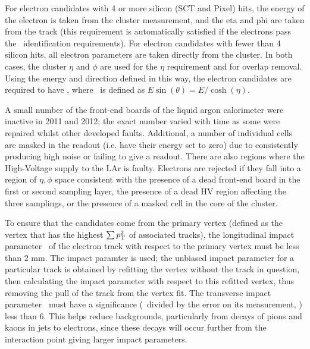 For electron candidates with 4 or more silicon (SCT and Pixel) hits, the energy
of the electron is taken from the cluster measurement, and the eta and phi are
taken from the track (this requirement is automatically satisfied if the
electrons pass the \loosePP\ identification requirements). For electron
candidates with fewer than 4 silicon hits, all electron parameters are taken
directly from the cluster. In both cases, the cluster $\eta$ and $\phi$ are used for
the $\eta$ requirement and for overlap removal. Using the energy and direction
defined in this way, the electron candidates are required to have ,
where \et\ is defined as $E\sin(\theta)=E/\cosh(\eta)$. 

A small number of the front-end boards of the liquid argon calorimeter were
inactive in 2011 and 2012; the exact number varied with time as some were
repaired whilst other developed faults. Additional, a number of individual cells
are masked in the readout (i.e. have their energy set to zero) due to
consistently producing high noise or failing to give a readout. There are also
regions where the High-Voltage supply to the LAr is faulty. Electrons are
rejected if they fall into a region of
$\eta, \phi$ space consistent with the presence of a dead front-end board in
the first or second sampling layer, the presence of a dead HV region affecting the
three samplings, or the presence of a masked cell in the core of the cluster.

To ensure that the candidates come from the primary vertex (defined as the
vertex that has the highest $\sum{\ensuremath{p_{\mathrm{T}}}^2}$ of associated tracks), the
longitudinal impact parameter \zzero\ of the electron track with respect to the
primary vertex must be less than 2 mm. The  impact paramter is
used; the unbiased impact parameter for a particular track is obtained by
refitting the vertex without the track in question, then calculating the impact
parameter with respect to this refitted vertex, thus removing the pull of the
track from the vertex fit.  The transverse impact parameter \dzero\ must have a
significance (\dzero\ divided by the error on its measurement, \dzerosig) less
than 6. This helps reduce backgrounds, particularly from decays of pions and
kaons in jets to electrons, since these decays will occur further from the
interaction point giving larger impact parameters.


